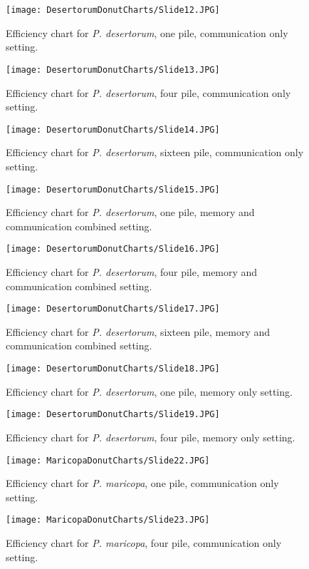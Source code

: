 \begin{figure}[h]
	\texttt{[image: DesertorumDonutCharts/Slide12.JPG]}
	\caption{Efficiency chart for \textit{P. desertorum}, one pile,  communication only setting.}
\end{figure}
\begin{figure}[h]
	\texttt{[image: DesertorumDonutCharts/Slide13.JPG]}
	\caption{Efficiency chart for \textit{P. desertorum}, four pile,  communication only setting.}
\end{figure}
\begin{figure}[h]
	\texttt{[image: DesertorumDonutCharts/Slide14.JPG]}
	\caption{Efficiency chart for \textit{P. desertorum}, sixteen pile,  communication only setting.}
\end{figure}
\begin{figure}[h]
	\texttt{[image: DesertorumDonutCharts/Slide15.JPG]}
	\caption{Efficiency chart for \textit{P. desertorum}, one pile,  memory and communication combined setting.}
\end{figure}
\begin{figure}[h]
	\texttt{[image: DesertorumDonutCharts/Slide16.JPG]}
	\caption{Efficiency chart for \textit{P. desertorum}, four pile, memory and communication combined setting.}
\end{figure}
\begin{figure}[h]
	\texttt{[image: DesertorumDonutCharts/Slide17.JPG]}
	\caption{Efficiency chart for \textit{P. desertorum}, sixteen pile,  memory and communication combined setting.}
\end{figure}
\begin{figure}[h]
	\texttt{[image: DesertorumDonutCharts/Slide18.JPG]}
	\caption{Efficiency chart for \textit{P. desertorum}, one pile,  memory only setting.}
\end{figure}
\begin{figure}[h]
	\texttt{[image: DesertorumDonutCharts/Slide19.JPG]}
	\caption{Efficiency chart for \textit{P. desertorum}, four pile,  memory only setting.}
\end{figure}
\clearpage
\begin{figure}[h]
	\texttt{[image: MaricopaDonutCharts/Slide22.JPG]}
	\caption{Efficiency chart for \textit{P. maricopa}, one pile,  communication only setting.}
\end{figure}
\begin{figure}[h]
	\texttt{[image: MaricopaDonutCharts/Slide23.JPG]}
	\caption{Efficiency chart for \textit{P. maricopa}, four pile,  communication only setting.}
\end{figure}
